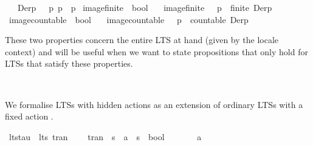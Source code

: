 \begin{isabellebody}
\ \ \ {\isacartoucheopen}Der{\isacharparenleft}{\kern0pt}p{\isacharcomma}{\kern0pt}\ {\isasymalpha}{\isacharparenright}{\kern0pt}\ {\isasymequiv}\ {\isacharbraceleft}{\kern0pt}p{\isacharprime}{\kern0pt}{\isachardot}{\kern0pt}\ p\ {\isasymlongmapsto}{\isasymalpha}\ p{\isacharprime}{\kern0pt}{\isacharbraceright}{\kern0pt}{\isacartoucheclose}\isanewline
\isanewline
{}\isamarkupfalse%
\ image{\isacharunderscore}{\kern0pt}finite\ {\isacharcolon}{\kern0pt}{\isacharcolon}{\kern0pt}\ {\isacartoucheopen}bool{\isacartoucheclose}\isanewline
\ \ \ {\isacartoucheopen}image{\isacharunderscore}{\kern0pt}finite\ {\isasymequiv}\ {\isacharparenleft}{\kern0pt}{\isasymforall}\ p\ {\isasymalpha}{\isachardot}{\kern0pt}\ finite\ Der{\isacharparenleft}{\kern0pt}p{\isacharcomma}{\kern0pt}\ {\isasymalpha}{\isacharparenright}{\kern0pt}{\isacharparenright}{\kern0pt}{\isacartoucheclose}\isanewline
{}\isamarkupfalse%
\ image{\isacharunderscore}{\kern0pt}countable\ {\isacharcolon}{\kern0pt}{\isacharcolon}{\kern0pt}\ {\isacartoucheopen}bool{\isacartoucheclose}\isanewline
\ \ \ {\isacartoucheopen}image{\isacharunderscore}{\kern0pt}countable\ {\isasymequiv}\ {\isacharparenleft}{\kern0pt}{\isasymforall}\ p\ {\isasymalpha}{\isachardot}{\kern0pt}\ countable\ Der{\isacharparenleft}{\kern0pt}p{\isacharcomma}{\kern0pt}\ {\isasymalpha}{\isacharparenright}{\kern0pt}{\isacharparenright}{\kern0pt}{\isacartoucheclose}%
\begin{isamarkuptext}%
These two properties concern the entire LTS at hand (given by the locale context) and will be useful when we want to state propositions that only hold for LTSs that satisfy these properties.%
\end{isamarkuptext}\isamarkuptrue%
\isamarkupfalse%
\ %
%
\begin{isamarkuptext}%
We formalise LTSs with hidden actions as an extension of ordinary LTSs with a fixed action \isa{{\isasymtau}}.%
\end{isamarkuptext}\isamarkuptrue%
\isamarkupfalse%
\ lts{\isacharunderscore}{\kern0pt}tau\ {\isacharequal}{\kern0pt}\ lts\ tran\ \isanewline
\ \ \ tran\ {\isacharcolon}{\kern0pt}{\isacharcolon}{\kern0pt}\ {\isacartoucheopen}{\isacharprime}{\kern0pt}s\ {\isasymRightarrow}\ {\isacharprime}{\kern0pt}a\ {\isasymRightarrow}\ {\isacharprime}{\kern0pt}s\ {\isasymRightarrow}\ bool{\isacartoucheclose}\ {\isacharplus}{\kern0pt}\ \isanewline
\ \ \ {\isasymtau}\ {\isacharcolon}{\kern0pt}{\isacharcolon}{\kern0pt}\ {\isacartoucheopen}{\isacharprime}{\kern0pt}a{\isacartoucheclose}\isanewline
%
\isadelimtheory
%
\endisadelimtheory
%
\isatagtheory
%
\endisatagtheory
{\isafoldtheory}%
%
\isadelimtheory
%
\endisadelimtheory
%
\end{isabellebody}%
